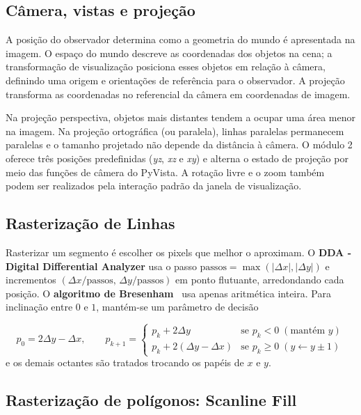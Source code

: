 \subsection{Câmera, vistas e projeção}

A posição do observador determina como a geometria do mundo é apresentada na imagem. O espaço do mundo descreve as coordenadas dos objetos na cena; a transformação de visualização posiciona esses objetos em relação à câmera, definindo uma origem e orientações de referência para o observador. A projeção transforma as coordenadas no referencial da câmera em coordenadas de imagem.

Na projeção perspectiva, objetos mais distantes tendem a ocupar uma área menor na imagem. Na projeção ortográfica (ou paralela), linhas paralelas permanecem paralelas e o tamanho projetado não depende da distância à câmera. O módulo 2 oferece três posições predefinidas (\textit{yz}, \textit{xz} e \textit{xy}) e alterna o estado de projeção por meio das funções de câmera do PyVista. A rotação livre e o zoom também podem ser realizados pela interação padrão da janela de visualização.

\subsection{Rasterização de Linhas}
Rasterizar um segmento é escolher os pixels que melhor o aproximam. O \textbf{DDA - Digital Differential Analyzer} usa o passo $\text{passos} = \max (|\Delta x|,|\Delta y|)$ e incrementos $(\Delta x/\text{passos},\,\Delta y/\text{passos})$ em ponto flutuante, arredondando cada posição. O \textbf{algoritmo de Bresenham}~\cite{bresenham1965} usa apenas aritmética inteira. Para inclinação entre $0$ e $1$, mantém-se um parâmetro de decisão

\begin{equation}
p_{0} = 2\Delta y - \Delta x, \qquad
p_{k+1} = \begin{cases} p_k + 2\Delta y & \text{se } p_k<0 \;(\text{mantém } y)\\ p_k + 2(\Delta y-\Delta x) & \text{se } p_k\ge 0 \;(y\leftarrow y\pm1)\end{cases}
\end{equation}
e os demais octantes são tratados trocando os papéis de $x$ e $y$.

\subsection{Rasterização de polígonos: Scanline Fill}

